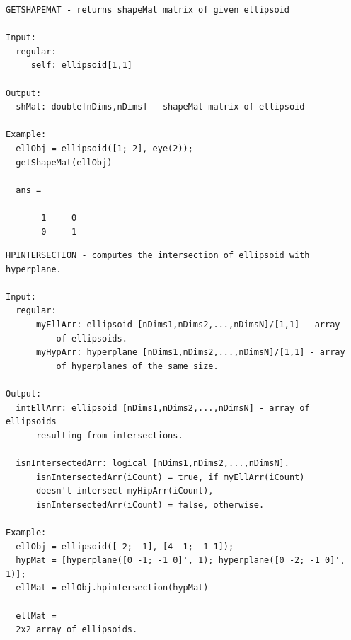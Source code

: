 \documentclass[letterpaper,10pt,english]{sphinxmanual}
\begin{document}
\begin{Verbatim}[commandchars=\\\{\}]
GETSHAPEMAT - returns shapeMat matrix of given ellipsoid

Input:
  regular:
     self: ellipsoid[1,1]

Output:
  shMat: double[nDims,nDims] - shapeMat matrix of ellipsoid

Example:
  ellObj = ellipsoid([1; 2], eye(2));
  getShapeMat(ellObj)

  ans =

       1     0
       0     1
\end{Verbatim}

\begin{Verbatim}[commandchars=\\\{\}]
HPINTERSECTION - computes the intersection of ellipsoid with hyperplane.

Input:
  regular:
      myEllArr: ellipsoid [nDims1,nDims2,...,nDimsN]/[1,1] - array
          of ellipsoids.
      myHypArr: hyperplane [nDims1,nDims2,...,nDimsN]/[1,1] - array
          of hyperplanes of the same size.

Output:
  intEllArr: ellipsoid [nDims1,nDims2,...,nDimsN] - array of ellipsoids
      resulting from intersections.

  isnIntersectedArr: logical [nDims1,nDims2,...,nDimsN].
      isnIntersectedArr(iCount) = true, if myEllArr(iCount)
      doesn't intersect myHipArr(iCount),
      isnIntersectedArr(iCount) = false, otherwise.

Example:
  ellObj = ellipsoid([-2; -1], [4 -1; -1 1]);
  hypMat = [hyperplane([0 -1; -1 0]', 1); hyperplane([0 -2; -1 0]', 1)];
  ellMat = ellObj.hpintersection(hypMat)

  ellMat =
  2x2 array of ellipsoids.
\end{Verbatim}
\end{document}
